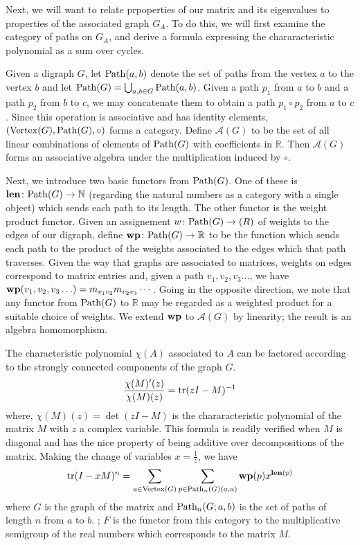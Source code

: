 Next, we will want to relate prpoperties of our matrix and its eigenvalues
to  properties of the associated graph $G_A$.  To do this, we will first
examine the category of paths on $G_A$, and derive a formula expressing
the chararacteristic polynomial as a sum over cycles.

Given a digraph $G$, let $\mathrm{Path} (a,b)$ denote the set of paths from the
vertex $a$ to the vertex $b$ and let $\mathrm{Path}(G) = \bigcup_{a,b \in G} \mathrm{Path} (a,b)$.
Given a path $p_1$ from $a$ to $b$ and a path $p_2$ from $b$ to $c$, we may
concatenate them to obtain a path $p_1 \circ p_2$ from $a$ to $c$.  Since
this operation is associative and has identity elements,
$(\mathrm{Vertex}(G), \mathrm{Path}(G), \circ)$ forms a category.  Define
$\mathcal{A}(G)$ to be the set of all linear combinations of elements of
$\mathrm{Path}(G)$ with coefficients in $\mathbb{R}$.  Then $\mathcal{A}(G)$ forms
an associative algebra under the multiplication induced by $\circ$.

Next, we introduce two basic functors from $\mathrm{Path} (G)$.  One of these is
$\mathbf{len} \colon \mathrm{Path}(G) \to \mathbb{N}$ (regarding the natural numbers
as a category with a single object) which sends each path to its length.
The other functor is the weight product functor.  Given an assignement
$w \colon \mathrm{Path}(G) \to \mathbb(R)$ of weights to the edges of our digraph,
define $\mathbf{wp} \colon \mathrm{Path}(G) \to \mathbb{R}$ to be the function which sends
each path to the product of the weights associated to the edges which
that path traverses.  Given the way that graphs are associated to matrices,
weights on edges correspond to matrix entries and, given a path
$v_1, v_2, v_3 \ldots$, we have $\mathbf{wp}(v_1, v_2, v_3 \ldots) =
m_{v_1 v_2} m_{v_2 v_3} \cdots$.  Going in the opposite direction, we
note that any functor from $\mathrm{Path}(G)$ to $\mathbb{R}$ may be regarded as
a weighted product for a suitable choice of weights.  We extend $\mathbf{wp}$ to
$\mathcal{A}(G)$ by linearity; the result is an algebra homomorphism.



The characteristic polynomial $\chi(A)$ associated to $A$ can be factored
according to the strongly connected components of the graph $G$.
\[
\frac{\chi(M)'(z)}{\chi(M)(z)} = \mathrm{tr} (zI - M)^{-1}
\]
where, $\chi(M)(z) = \det (zI - M)$ is the chararacteristic polynomial of the
matrix $M$ with $z$ a complex variable.  This formula is readily verified when
$M$ is diagonal and has the nice property of being additive over decompositions
of the matrix. Making the change of variables $x=\frac{1}{z}$, we have
\[
\mathrm{tr} (I - xM)^n =
\sum_{a \in \mathrm{Vertex}(G)} \sum_{p \in \mathrm{Path}_n (G)(a,a)} \mathbf{wp}(p) x^{\mathbf{len}(p)}
\]
where $G$ is the graph of the matrix and $\mathrm{Path}_n (G;a,b)$ is the set of
paths of length $n$ from $a$ to $b$.  ; $F$ is the functor from this category
to the multiplicative semigroup of the real numbers which corresponds to the matrix $M$.

